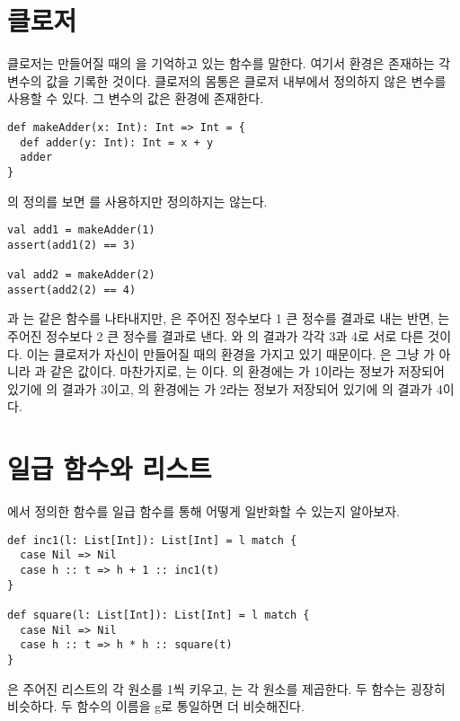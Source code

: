 \section{클로저}

클로저는 만들어질 때의 을 기억하고 있는 함수를 말한다.
여기서 환경은 존재하는 각 변수의 값을 기록한 것이다. 클로저의 몸통은 클로저
내부에서 정의하지 않은 변수를 사용할 수 있다. 그 변수의 값은 환경에 존재한다.

\begin{verbatim}
def makeAdder(x: Int): Int => Int = {
  def adder(y: Int): Int = x + y
  adder
}
\end{verbatim}

의 정의를 보면 를 사용하지만 정의하지는 않는다.

\begin{verbatim}
val add1 = makeAdder(1)
assert(add1(2) == 3)

val add2 = makeAdder(2)
assert(add2(2) == 4)
\end{verbatim}

과 는 같은  함수를 나타내지만, 은
주어진 정수보다 1 큰 정수를 결과로 내는 반면, 는 주어진 정수보다 2 큰
정수를 결과로 낸다. 와 의 결과가 각각 3과 4로 서로
다른 것이다. 이는 클로저가 자신이 만들어질 때의 환경을 가지고 있기 때문이다.
은 그냥 가 아니라 과 같은 값이다.
마찬가지로, 는 이다. 의 환경에는
가 1이라는 정보가 저장되어 있기에 의 결과가 3이고,
의 환경에는 가 2라는 정보가 저장되어 있기에 의
결과가 4이다.

\section{일급 함수와 리스트}

에서 정의한 함수를 일급 함수를 통해 어떻게 일반화할 수
있는지 알아보자.

\begin{verbatim}
def inc1(l: List[Int]): List[Int] = l match {
  case Nil => Nil
  case h :: t => h + 1 :: inc1(t)
}

def square(l: List[Int]): List[Int] = l match {
  case Nil => Nil
  case h :: t => h * h :: square(t)
}
\end{verbatim}

은 주어진 리스트의 각 원소를 1씩 키우고, 는 각 원소를
제곱한다. 두 함수는 굉장히 비슷하다. 두 함수의 이름을 g로 통일하면 더
비슷해진다.

